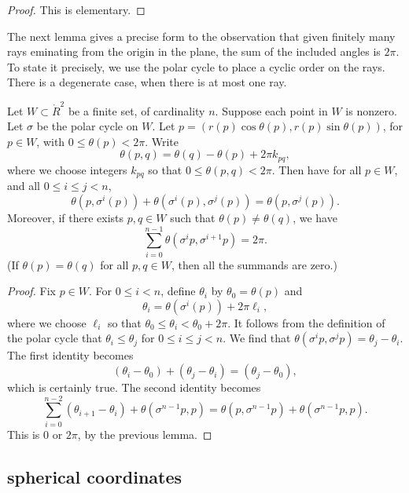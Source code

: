 \begin{proof} This is elementary.
\end{proof}

The next lemma gives a precise form to the observation
that given finitely many rays eminating from the origin
in the plane, the sum of the included angles is $2\pi$.
To state it precisely, we use the polar cycle to place
a cyclic order on the rays.  There is a degenerate case,
when there is at most one ray.


\begin{lemma}\label{lemma:polar-sum}
Let $W\subset\ring{R}^2$ be a finite set,
of cardinality $n$. Suppose each point in $W$ is nonzero.
Let $\sigma$ be the polar cycle on $W$.  
Let $p=(r(p)\cos\theta(p),r(p)\sin\theta(p))$, for $p\in W$, with
$0\le\theta(p)<2\pi$.
Write
   $$
   \theta(p,q) = \theta(q) - \theta(p) + 2\pi k_{pq},
   $$
where we choose integers $k_{pq}$ so that $0\le \theta(p,q) < 2\pi$.
Then have for all $p\in W$,
and all $0\le i \le j < n$,
   $$
   \theta(p,\sigma^i(p)) +\theta(\sigma^i(p),\sigma^j(p)) =
   \theta(p,\sigma^j(p)).
   $$
Moreover, if there exists $p,q\in W$ such that $\theta(p)\ne\theta(q)$,
we have 
  $$
  \sum_{i=0}^{n-1} \theta(\sigma^{i}p,\sigma^{i+1} p) = 2\pi.
  $$
(If $\theta(p)=\theta(q)$ for all $p,q\in W$, then all the
summands are zero.)
\end{lemma}

\begin{proof}
Fix $p\in W$.
For $0\le i<n$, define $\theta_i$ by
   $\theta_0=\theta(p)$ and 
   $$\theta_i = \theta(\sigma^i(p)) + 2\pi \ell_i,$$
where we choose $\ell_i$ so that $\theta_0\le \theta_i < \theta_0+2\pi$.
It follows from the definition of the polar cycle that
$\theta_i \le \theta_j$ for $0\le i\le j < n$. We find that
$\theta(\sigma^i p ,\sigma^j p) = \theta_j - \theta_i$.
The first identity becomes
  $$
  (\theta_i-\theta_0) + (\theta_j-\theta_i) = (\theta_j-\theta_0),
  $$
which is certainly true.
The second identity becomes
  $$
  \sum_{i=0}^{n-2} (\theta_{i+1}-\theta_i) + \theta(\sigma^{n-1}p,p)
  = \theta(p,\sigma^{n-1}p) + \theta(\sigma^{n-1}p,p).
  $$
This is $0$ or $2\pi$, by the previous lemma.
\end{proof}

\subsection{spherical coordinates}
\label{sec:spherical}



